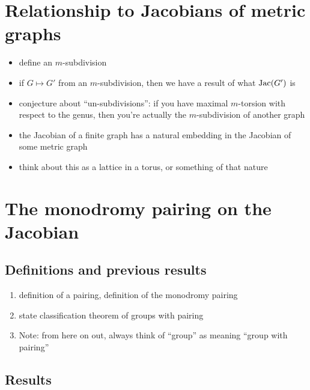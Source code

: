 \documentclass{amsart}
\begin{document}
\section{Relationship to Jacobians of metric graphs}

\begin{itemize}
\item define an $m$-subdivision
\item if $G\mapsto G'$ from an $m$-subdivision, then we have a result of what $\operatorname{Jac}(G')$ is
\item conjecture about ``un-subdivisions'': if you have maximal $m$-torsion with respect to the genus, then you're actually the $m$-subdivision of another graph
\item the Jacobian of a finite graph has a natural embedding in the Jacobian of some metric graph
\item think about this as a lattice in a torus, or something of that nature
\end{itemize}

\section{The monodromy pairing on the Jacobian}

\subsection{Definitions and previous results}

\begin{enumerate}
\item definition of a pairing, definition of the monodromy pairing
\item state classification theorem of groups with pairing
\item Note: from here on out, always think of ``group'' as meaning ``group with pairing''
\end{enumerate}

\subsection{Results}
\end{document}
